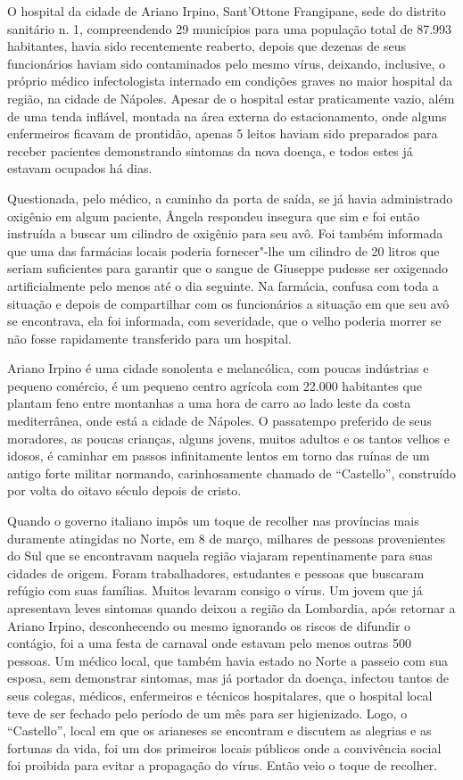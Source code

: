 O hospital da cidade de Ariano Irpino, Sant'Ottone Frangipane, sede do
distrito sanitário n. 1, compreendendo 29 municípios para uma população
total de 87.993 habitantes, havia sido recentemente reaberto, depois que
dezenas de seus funcionários haviam sido contaminados pelo mesmo vírus,
deixando, inclusive, o próprio médico infectologista internado em
condições graves no maior hospital da região, na cidade de Nápoles.
Apesar de o hospital estar praticamente vazio, além de uma tenda
inflável, montada na área externa do estacionamento, onde alguns
enfermeiros ficavam de prontidão, apenas 5 leitos haviam sido preparados
para receber pacientes demonstrando sintomas da nova doença, e todos
estes já estavam ocupados há dias.

Questionada, pelo médico, a caminho da porta de saída, se já havia
administrado oxigênio em algum paciente, Ângela respondeu insegura que
sim e foi então instruída a buscar um cilindro de oxigênio para seu avô.
Foi também informada que uma das farmácias locais poderia fornecer"-lhe
um cilindro de 20 litros que seriam suficientes para garantir que o
sangue de Giuseppe pudesse ser oxigenado artificialmente pelo menos até
o dia seguinte. Na farmácia, confusa com toda a situação e depois de
compartilhar com os funcionários a situação em que seu avô se
encontrava, ela foi informada, com severidade, que o velho poderia
morrer se não fosse rapidamente transferido para um hospital.

Ariano Irpino é uma cidade sonolenta e melancólica, com poucas
indústrias e pequeno comércio, é um pequeno centro agrícola com 22.000
habitantes que plantam feno entre montanhas a uma hora de carro ao lado
leste da costa mediterrânea, onde está a cidade de Nápoles. O passatempo
preferido de seus moradores, as poucas crianças, alguns jovens, muitos
adultos e os tantos velhos e idosos, é caminhar em passos infinitamente
lentos em torno das ruínas de um antigo forte militar normando,
carinhosamente chamado de ``Castello'', construído por volta do oitavo
século depois de cristo.

Quando o governo italiano impôs um toque de recolher nas províncias mais
duramente atingidas no Norte, em 8 de março, milhares de pessoas
provenientes do Sul que se encontravam naquela região viajaram
repentinamente para suas cidades de origem. Foram trabalhadores,
estudantes e pessoas que buscaram refúgio com suas famílias. Muitos
levaram consigo o vírus. Um jovem que já apresentava leves sintomas
quando deixou a região da Lombardia, após retornar a Ariano Irpino,
desconhecendo ou mesmo ignorando os riscos de difundir o contágio, foi a
uma festa de carnaval onde estavam pelo menos outras 500 pessoas. Um
médico local, que também havia estado no Norte a passeio com sua esposa,
sem demonstrar sintomas, mas já portador da doença, infectou tantos de
seus colegas, médicos, enfermeiros e técnicos hospitalares, que o
hospital local teve de ser fechado pelo período de um mês para ser
higienizado. Logo, o ``Castello'', local em que os arianeses se
encontram e discutem as alegrias e as fortunas da vida, foi um dos
primeiros locais públicos onde a convivência social foi proibida para
evitar a propagação do vírus. Então veio o toque de recolher.

